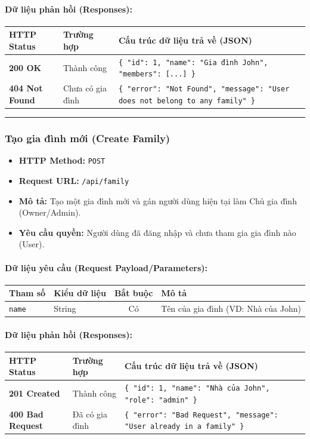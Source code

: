 \documentclass[12pt,a4paper]{article}
\begin{document}
\paragraph{Dữ liệu phản hồi (Responses):}
\begin{longtable}{|p{2.8cm}|p{3.2cm}|p{8.0cm}|}
\hline
\textbf{HTTP Status} & \textbf{Trường hợp} & \textbf{Cấu trúc dữ liệu trả về (JSON)} \\ \hline
\endhead
\textbf{200 OK} & Thành công & \texttt{\{ "id": 1, "name": "Gia đình John", "members": [...] \}} \\ \hline
\textbf{404 Not Found} & Chưa có gia đình & \texttt{\{ "error": "Not Found", "message": "User does not belong to any family" \}} \\ \hline
\end{longtable}

\vskip 0.4cm
\noindent\rule{\textwidth}{0.3pt}
\vskip 0.4cm

\subsubsection{Tạo gia đình mới (Create Family)}
\begin{itemize}[leftmargin=*]
    \item \textbf{HTTP Method:} \texttt{POST}
    \item \textbf{Request URL:} \texttt{/api/family}
    \item \textbf{Mô tả:} Tạo một gia đình mới và gán người dùng hiện tại làm Chủ gia đình (Owner/Admin).
    \item \textbf{Yêu cầu quyền:} Người dùng đã đăng nhập và chưa tham gia gia đình nào (User).
\end{itemize}

\paragraph{Dữ liệu yêu cầu (Request Payload/Parameters):}
\begin{longtable}{|p{2.8cm}|p{2.2cm}|c|p{7.0cm}|}
\hline
\textbf{Tham số} & \textbf{Kiểu dữ liệu} & \textbf{Bắt buộc} & \textbf{Mô tả} \\ \hline
\endhead
\texttt{name} & String & Có & Tên của gia đình (VD: Nhà của John) \\ \hline
\end{longtable}

\paragraph{Dữ liệu phản hồi (Responses):}
\begin{longtable}{|p{2.8cm}|p{3.2cm}|p{8.0cm}|}
\hline
\textbf{HTTP Status} & \textbf{Trường hợp} & \textbf{Cấu trúc dữ liệu trả về (JSON)} \\ \hline
\endhead
\textbf{201 Created} & Thành công & \texttt{\{ "id": 1, "name": "Nhà của John", "role": "admin" \}} \\ \hline
\textbf{400 Bad Request} & Đã có gia đình & \texttt{\{ "error": "Bad Request", "message": "User already in a family" \}} \\ \hline
\end{longtable}
\end{document}
